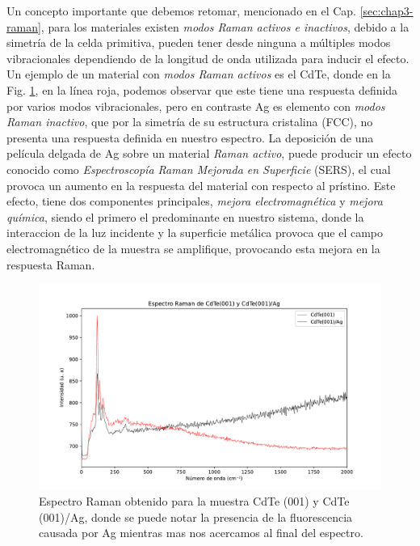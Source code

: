 Un concepto importante que debemos retomar, mencionado en el Cap. \ref{sec:chap3-raman}, para los materiales existen \textit{modos Raman activos e inactivos}, debido a la simetría de la celda primitiva, pueden tener desde ninguna a múltiples modos vibracionales dependiendo de la longitud de onda utilizada para inducir el efecto. Un ejemplo de un material con \textit{modos Raman activos} es el CdTe, donde en la Fig. \ref{fig:raman-cdte-all}, en la línea roja, podemos observar que este tiene una respuesta definida por varios modos vibracionales, pero en contraste Ag es elemento con \textit{modos Raman inactivo}, que por la simetría de su estructura cristalina (FCC), no presenta una respuesta definida en nuestro espectro. La deposición de una película delgada de Ag sobre un material \textit{Raman activo}, puede producir un efecto conocido como \textit{Espectroscopía Raman Mejorada en Superficie} (SERS), el cual provoca un aumento en la respuesta del material con respecto al prístino. Este efecto, tiene dos componentes principales, \textit{mejora electromagnética} y \textit{mejora química}, siendo el primero el predominante en nuestro sistema, donde la interaccion de la luz incidente y la superficie metálica provoca que el campo electromagnético de la muestra se amplifique, provocando esta mejora en la respuesta Raman\cite{Sun2016}.

\begin{figure}[H]
    \centering
    \includegraphics[width=1\textwidth]{figures/chap4/cdte-ag/raman-results/raman-CdTeAg-all.pdf}
    \caption{Espectro Raman obtenido para la muestra CdTe (001) y CdTe (001)/Ag, donde se
        puede notar la presencia de la fluorescencia causada por Ag mientras mas nos 
        acercamos al final del espectro.}
    \label{fig:raman-cdte-all}
\end{figure}

